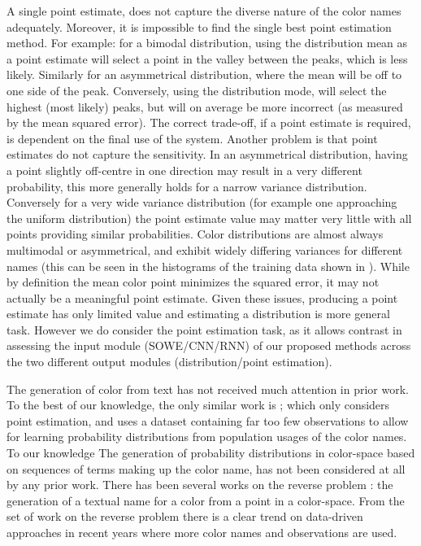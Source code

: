\documentclass[]{book}
\newcommand{\parencite}{\citep}
\newcommand{\textcite}{\citet}
\begin{document}
A single point estimate, does not capture the diverse nature of the color names adequately. Moreover, it is impossible to find the single best point estimation method.
For example: for a bimodal distribution, using the distribution mean as a point estimate will select a point in the valley between the peaks, which is less likely.
Similarly for an asymmetrical distribution, where the mean will be off to one side of the peak.
Conversely, using the distribution mode, will select the highest (most likely) peaks, but will on average be more incorrect (as measured by the mean squared error).
The correct trade-off, if a point estimate is required, is dependent on the final use of the system.
Another problem is that point estimates do not capture the sensitivity.
In an asymmetrical distribution, having a point slightly off-centre in one direction may result in a very different probability,
this more generally holds for a narrow variance distribution.
Conversely for a very wide variance distribution (for example one approaching the uniform distribution) the point estimate value may matter very little with all points providing similar probabilities.
Color distributions are almost always multimodal or asymmetrical, and exhibit widely differing variances for different names (this can be seen in the histograms of the training data shown in ).
While by definition the mean color point minimizes the squared error, it may not actually be a  meaningful point estimate.
Given these issues, producing a point estimate has only limited value and estimating a distribution is more general task.
However we do consider the point estimation task, as it allows contrast in assessing the input module (SOWE/CNN/RNN) of our proposed methods across the two different output modules (distribution/point estimation).

The generation of color from text has not received much attention in prior work.
To the best of our knowledge, the only similar work is \textcite{DBLP:journals/corr/KawakamiDRS16};
which only considers point estimation,
and uses a dataset containing far too few observations to allow for learning probability distributions from population usages of the color names.
To our knowledge The generation of probability distributions in color-space based on sequences of terms making up the color name, has not been considered at all by any prior work.
There has been several works on the reverse problem \parencite{mcmahan2015bayesian,meomcmahanstone:color,2016arXiv160603821M}: the generation of a textual name for a color from a point in a color-space.
From the set of work on the reverse problem there is a clear trend on data-driven approaches in recent years where more color names and observations are used.
\end{document}
